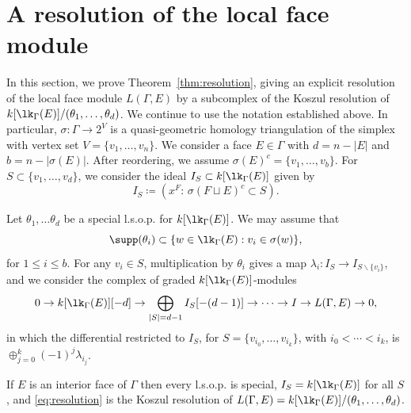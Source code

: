 \section{A resolution of the local face module}

In this section, we prove Theorem~\ref{thm:resolution}, giving an explicit resolution of the local face module $L(\Gamma,E)$ by a subcomplex of the Koszul resolution of $k[\lk_{\Gamma}(E)]/(\theta_1, \dotsc, \theta_{d})$.  We continue to use the notation established above.  In particular, $\sigma\colon \Gamma \to 2^V$ is a quasi-geometric homology triangulation of the simplex with vertex set $V = \{v_1, \ldots, v_n\}$. We consider a face $E \in \Gamma$ with $d = n - |E|$ and $b = n - |\sigma(E)|$.  After reordering, we assume $\sigma(E)^c = \{v_{1}, \dotsc, v_{b}\}$. For $S \subset \{v_1, \ldots, v_d\}$, 
we consider the ideal $I_S \subset k[\lk_\Gamma(E)]$ given by
\begin{equation*}
I_S  \coloneqq  ( x^F : \, \sigma(F \sqcup E)^c \subset S).  
\end{equation*}

Let $\theta_1, \ldots \theta_d$ be a special l.s.o.p. for $k[\lk_\Gamma(E)]$. We may assume that 
\[
\supp(\theta_i) \subset \{ w \in \lk_\Gamma(E) : v_i \in \sigma(w) \},
\]
for $1 \leq i \leq b$.  For any $v_i \in S$, multiplication by $\theta_i$ gives a map $\lambda_i \colon I_{S} \to I_{S \smallsetminus \{v_i\}}$, and we consider the complex of graded $k[\lk_{\Gamma}(E)]$-modules
 \begin{equation} \label{eq:resolution}
 0  \to k[\lk_{\Gamma}(E)][-d] \to \bigoplus_{ |S|  = d - 1 } I_{S}[-(d-1)] \to \dotsb  \to  I \to L(\Gamma,E) \to 0,
\end{equation}
in which
 the differential restricted to $I_S$, for $S= \{v_{i_0}, \ldots, v_{i_k}\}$, with $i_0 < \cdots < i_k$, is $\oplus_{j = 0}^k (-1)^j \lambda_{i_j}$. 


\begin{example}
If $E$ is an interior face of $\Gamma$ then every l.s.o.p. is special, $I_S = k[\lk_{\Gamma}(E)]$ for all $S$, and \eqref{eq:resolution} is the Koszul resolution of $L(\Gamma,E) = k[\lk_{\Gamma}(E)]/(\theta_1,\ldots,\theta_{d})$.
\end{example}

